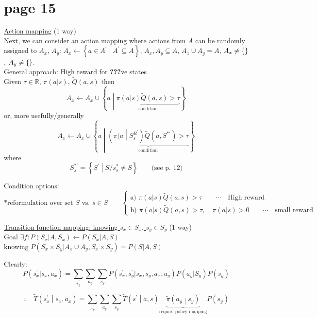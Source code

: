 \section*{page 15}

\underline{Action mapping} (1 way)\\

Next, we can consider an action mapping where actions from $A$ can be randomly assigned to $A_x$, $A_y$: $A_x \leftarrow \left\{ a\in A^\prime \middle| A^\prime \subseteq A \right \}$, $A_x, A_y\subseteq A$, $A_x \cup A_y = A$, $A_x \neq \{ \null \}$, $A_y \neq	 \{ \null \}$.\\

\underline{General approach}: \underline{High reward for \textbf{???}ve states}\\

Given $\tau \in \mathbb{R}$, $\pi(a|s)$, $\tilde{Q}(a,s)$ then 
\begin{equation*}
A_x \leftarrow A_x \cup \left\{ a  \middle| \underbrace{ \pi(a|s) \tilde{Q}(a,s) > \tau }_{\text{condition}} \right\}
\end{equation*}
or, more usefully/generally
\begin{equation*}
A_x \leftarrow A_x \cup \left\{ a \middle| \underbrace{ \left( \pi (a \middle|  S_s^{R^\prime} \right) \tilde{Q}(a,S^{*\prime}) > \tau }_{\text{condition}} \right\}
\end{equation*}
where
\begin{equation*}
S_s^{*\prime}=\left\{ S^\prime \middle| S/s_s^* \neq S\right\} \qquad\text{(see p. 12)}
\end{equation*}

Condition options:
\begin{equation*}
\ast \text{reformulation over set }S\text{\ vs.\ }s\in S\qquad 
\left\{ 
\begin{array}{l}
\text{a)\ }\pi(a|s)\tilde{Q}(a,s)>\tau \qquad \cdots \quad \text{High reward} \\
\text{b)\ }\pi(a|s)\tilde{Q}(a,s)>\tau,\quad\pi(a|s)>0\qquad \cdots \quad \text{small reward}
\end{array}
\right.
\end{equation*}

\underline{Transition function mapping: knowing $s_x\in S_x$, $s_y\in S_y$} (1 way)\\

Goal $\exists f:P(S_x|A,S_x)\leftarrow P(S_x|A,S)$\\
knowing $P(S_x \times S_y | A_x \cup A_y, S_x \times S_y)=P(S|A,S)$

Clearly: 
\begin{equation*}
P(s^\prime_x|s_x,a_x) = \sum_{s_y^\prime}\sum_{a_y}\sum_{s_y} P\left( s_x^\prime,s_y^\prime|s_x,s_y,a_x,a_y\right)P\left(a_y|S_y \right)P\left( s_y \right)
\end{equation*}

\begin{equation*}
\therefore\quad\tilde{T}\left( s^\prime_x \middle| s_x, a_x \right) = \sum_{s^\prime_y} \sum_{a_y} \sum_{s_y} \tilde{T}\left( s^\prime \middle| a, s  \right) \underbrace{\tilde{\pi}\left( a_y \middle| s_y \right)}_{\text{require policy mapping}}P(s_y)
\end{equation*}
